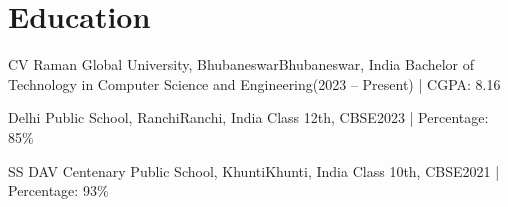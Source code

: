 \section{Education}
\resumeSubHeadingListStart

\resumeSubheading
{CV Raman Global University, Bhubaneswar}{Bhubaneswar, India}
{Bachelor of Technology in Computer Science and Engineering}{(2023 -- Present) | CGPA: 8.16 }

\resumeSubheading
{Delhi Public School, Ranchi}{Ranchi, India}
{Class 12th, CBSE}{2023 | Percentage: 85\%}

\resumeSubheading
{SS DAV Centenary Public School, Khunti}{Khunti, India}
{Class 10th, CBSE}{2021 | Percentage: 93\%}

\resumeSubHeadingListEnd
